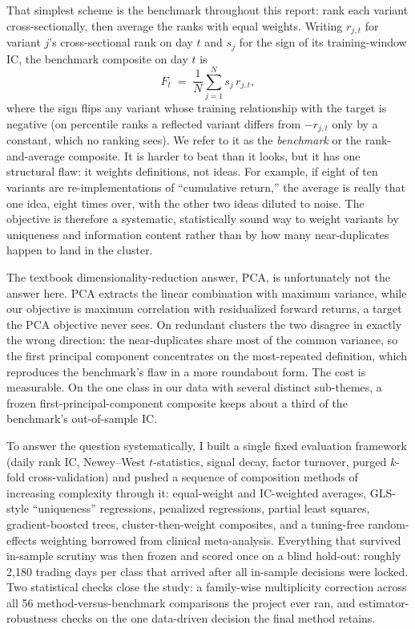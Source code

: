 \documentclass[11pt]{article}
\begin{document}
That simplest scheme is the benchmark throughout this report: rank each variant
cross-sectionally, then average the ranks with equal weights. Writing $r_{j,t}$ for
variant $j$'s cross-sectional rank on day $t$ and $s_j$ for the sign of its
training-window IC, the benchmark composite on day $t$ is
\begin{equation}
F_t \;=\; \frac{1}{N}\sum_{j=1}^{N} s_j\, r_{j,t},
\label{eq:benchmark}
\end{equation}
where the sign flips any variant whose training relationship with the target is negative
(on percentile ranks a reflected variant differs from $-r_{j,t}$ only by a constant,
which no ranking sees). We refer to it as the \emph{benchmark} or the rank-and-average
composite. It is harder to beat than it looks, but
it has one structural flaw: it weights definitions, not ideas. For example, if eight of ten
variants are re-implementations of ``cumulative return,'' the average is really that one
idea, eight times over, with the other two ideas diluted to noise. The objective is
therefore a systematic, statistically sound way to weight variants by uniqueness and
information content rather than by how many near-duplicates happen to land in the cluster.

The textbook dimensionality-reduction answer, PCA, is unfortunately not the answer here.
PCA extracts the linear combination with maximum variance, while our objective is
maximum correlation with residualized forward returns, a target the PCA objective never
sees. On redundant clusters the two
disagree in exactly the wrong direction: the near-duplicates share most of the common
variance, so the first principal component concentrates on the most-repeated definition,
which reproduces the benchmark's flaw in a more roundabout form. The cost is measurable. On the
one class in our data with several distinct sub-themes, a frozen first-principal-component
composite keeps about a third of the benchmark's out-of-sample IC.

To answer the question systematically, I built a single fixed evaluation framework (daily
rank IC, Newey--West $t$-statistics, signal decay, factor turnover, purged $k$-fold
cross-validation) and pushed a sequence of composition methods of increasing complexity
through it: equal-weight and IC-weighted averages, GLS-style ``uniqueness'' regressions,
penalized regressions, partial least squares, gradient-boosted trees, cluster-then-weight
composites, and a tuning-free random-effects weighting borrowed from clinical meta-analysis.
Everything that survived in-sample scrutiny was then frozen and scored once on a blind
hold-out: roughly 2{,}180 trading days per class that arrived after all in-sample decisions
were locked. Two statistical checks close the study: a family-wise multiplicity correction
across all 56 method-versus-benchmark comparisons the project ever ran, and
estimator-robustness checks on the one data-driven decision the final method retains.
\end{document}

